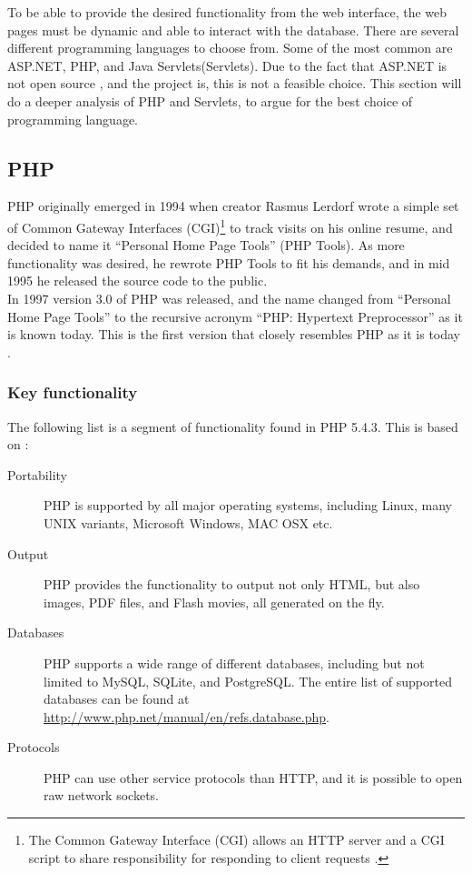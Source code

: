 To be able to provide the desired functionality from the web interface, the web pages must be dynamic and able to interact with the database. There are several different programming languages to choose from. Some of the most common are ASP.NET, PHP, and Java Servlets(Servlets). Due to the fact that ASP.NET is not open source \cite{aspTerms}, and the project is, this is not a feasible choice. This section will do a deeper analysis of PHP and Servlets, to argue for the best choice of programming language.

\subsection*{PHP}
PHP originally emerged in 1994 when creator Rasmus Lerdorf wrote a simple set of Common Gateway Interfaces (CGI)\footnote{The Common Gateway Interface (CGI) allows an HTTP server and a CGI script to share responsibility for responding to client requests \cite{CGI}.} to track visits on his online resume, and decided to name it ``Personal Home Page Tools'' (PHP Tools). As more functionality was desired, he rewrote PHP Tools to fit his demands, and in mid 1995 he released the source code to the public.
\\In 1997 version 3.0 of PHP was released, and the name changed from ``Personal Home Page Tools'' to the recursive acronym ``PHP: Hypertext Preprocessor'' as it is known today. This is the first version that closely resembles PHP as it is today \cite{phpHistory}.


\subsubsection*{Key functionality}

\noindent The following list is a segment of functionality found in PHP 5.4.3. This is based on \cite{phpFunctionality}:

\begin{description}
	\item[Portability] PHP is supported by all major operating systems, including Linux, many UNIX variants, Microsoft Windows, MAC OSX etc.
	\item[Output] PHP provides the functionality to output not only HTML, but also images, PDF files, and Flash movies, all generated on the fly.
	\item[Databases] PHP supports a wide range of different databases, including but not limited to MySQL, SQLite, and PostgreSQL. The entire list of supported databases can be found at \url{http://www.php.net/manual/en/refs.database.php}. 
	\item[Protocols] PHP can use other service protocols than HTTP, and it is possible to open raw network sockets.
\end{description}


